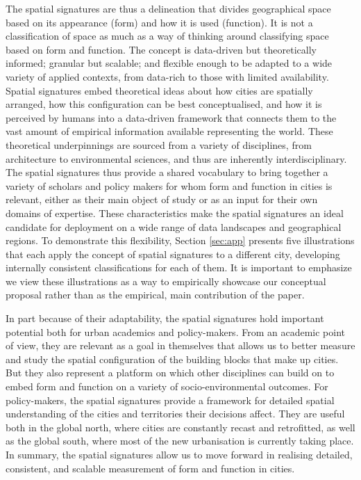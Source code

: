 The spatial signatures are thus a delineation that divides geographical space
based on its appearance (form) and how it is used (function).
It is not a classification of space as much as a way of thinking around
classifying space based on form and function.
The concept is data-driven but theoretically informed;
granular but scalable; and flexible enough to be adapted to a wide variety of
applied contexts, from data-rich to those with limited availability.
%
Spatial signatures embed theoretical ideas about how cities are
spatially arranged, how this configuration can be best conceptualised, and how
it is perceived by humans into a data-driven framework that connects them to the
vast amount of empirical information available representing the world.
%
These theoretical underpinnings are sourced from a variety of disciplines,
from architecture to environmental sciences, and thus are inherently
interdisciplinary.
%
The spatial signatures thus provide a shared vocabulary to bring together a
variety of scholars and policy makers for whom form and function in cities is
relevant, either as their main object of study or as an input for their own domains
of expertise.
%
These characteristics make the spatial signatures an ideal candidate
for deployment on a wide range of data landscapes and geographical regions.
To demonstrate this flexibility, Section \ref{sec:app} presents five illustrations
that each apply the concept of spatial signatures to a different city, developing
internally consistent classifications for each of them.
%
It is important to emphasize we view these illustrations as a way to empirically
showcase our conceptual proposal rather than as the empirical, main contribution of
the paper.

In part because of their adaptability,
the spatial signatures hold important potential both for urban academics and
policy-makers.
From an academic point of view, they are relevant as a goal in themselves
that allows us to better measure and study the spatial configuration of the
building blocks that make up cities. But they also represent a platform on
which other disciplines can build on to embed form and function on a variety
of socio-environmental outcomes.
For policy-makers, the spatial signatures provide a framework for detailed
spatial understanding of the cities and territories their decisions affect.
They are useful both in the global
north, where cities are constantly recast and retrofitted, as well as the
global south, where most of the new urbanisation is currently taking place.
%
In summary, the spatial signatures allow us to move forward in realising
detailed, consistent, and scalable measurement of form and function in
cities.

